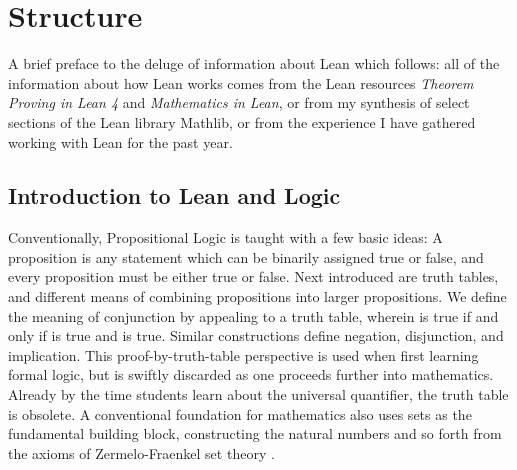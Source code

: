 

\chapter{Structure}

A brief preface to the deluge of information about Lean which follows:
all of the information about how Lean works comes from the Lean resources
\textit{Theorem Proving in Lean 4}\cite{TPiL} and 
\textit{Mathematics in Lean}\cite{MIL}, or from my synthesis of select
sections of the Lean library Mathlib, or from the experience
I have gathered working with Lean for the past year.

\section{Introduction to Lean and Logic}

Conventionally, Propositional Logic is taught with a few basic ideas:
A proposition is any statement which can be binarily assigned true or 
false, and every proposition must be either true or false. Next introduced 
are truth tables, and different means of combining propositions into 
larger propositions. We define the meaning of conjunction by appealing to 
a truth table, wherein  is true if and only if  is true 
and  is true. Similar constructions define negation, disjunction, 
and implication. This proof-by-truth-table perspective is used when
first learning formal logic, but is swiftly discarded as one proceeds
further into mathematics. Already by the time students learn 
about the universal quantifier, the truth table is obsolete.
A conventional foundation for mathematics also uses sets as the 
fundamental building block, constructing the natural numbers and so 
forth from the axioms of Zermelo-Fraenkel set theory \cite{RealAnalysis}.

